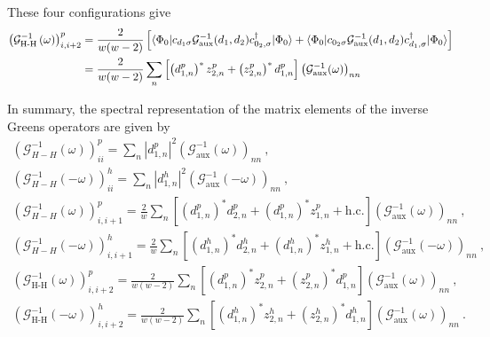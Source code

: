 \documentclass{report}
\numberwithin{equation}{section}
\begin{document}
These four configurations give
\begin{equation}\begin{aligned}
	\left(\mathcal{G}_\text{H-H}^{-1}\left( \omega \right) \right)^p_{i,i+2} &= \frac{2}{w(w-2)}\left[\braket{\Phi_0|c_{d_1\sigma}\mathcal{G}^{-1}_\text{aux}(d_1,d_2)c^\dagger_{0_2,\sigma}|\Phi_0} + \braket{\Phi_0|c_{0_2\sigma}\mathcal{G}^{-1}_\text{aux}(d_1,d_2)c^\dagger_{d_1,\sigma}|\Phi_0}\right] \\
										 &= \frac{2}{w(w-2)}\sum_n \left[\left(d^p_{1,n}\right)^* z^p_{2,n} + \left(z^p_{2,n}\right)^* d^p_{1,n}\right] \left(\mathcal{G}^{-1}_\text{aux}(\omega)\right)_{nn}
\end{aligned}\end{equation}


In summary, the spectral representation of the matrix elements of the inverse Greens operators are given by
\begin{gather}
\label{green_eq_final_2siam}
	\left(\mathcal{G}^{-1}_{H-H}(\omega)\right)^p_{ii} = \sum_{n} |d^p_{1,n}|^2 \left(\mathcal{G}^{-1}_\text{aux}(\omega)\right)_{nn}~,\\
	\left(\mathcal{G}^{-1}_{H-H}(-\omega)\right)^h_{ii} = \sum_{n} |d^h_{1,n}|^2 \left(\mathcal{G}^{-1}_\text{aux}(-\omega)\right)_{nn}~,\\
	\left(\mathcal{G}^{-1}_{H-H}\left(\omega\right) \right)^p_{i,i+1} = \frac{2}{w} \sum_n \left[\left(d^p_{1,n}\right)^*d^p_{2,n} + \left(d^p_{1,n}\right)^* z^p_{1,n} + \text{h.c.}\right] \left(\mathcal{G}^{-1}_\text{aux}(\omega) \right)_{nn}~,\\
	\left(\mathcal{G}^{-1}_{H-H}\left(-\omega\right) \right)^h_{i,i+1} = \frac{2}{w} \sum_n \left[\left(d^h_{1,n}\right)^*d^h_{2,n} + \left(d^h_{1,n}\right)^* z^h_{1,n} + \text{h.c.}\right] \left(\mathcal{G}^{-1}_\text{aux}(-\omega) \right)_{nn}~,\\
	\left(\mathcal{G}_\text{H-H}^{-1}\left( \omega \right) \right)^p_{i,i+2} = \frac{2}{w(w-2)}\sum_n \left[\left(d^p_{1,n}\right)^* z^p_{2,n} + \left(z^p_{2,n}\right)^* d^p_{1,n}\right] \left(\mathcal{G}^{-1}_\text{aux}(\omega)\right)_{nn}~,\\
	\left(\mathcal{G}_\text{H-H}^{-1}\left( -\omega \right) \right)^h_{i,i+2} = \frac{2}{w(w-2)}\sum_n \left[\left(d^h_{1,n}\right)^* z^h_{2,n} + \left(z^h_{2,n}\right)^* d^h_{1,n}\right] \left(\mathcal{G}^{-1}_\text{aux}(\omega)\right)_{nn}~.
\end{gather}
\end{document}
